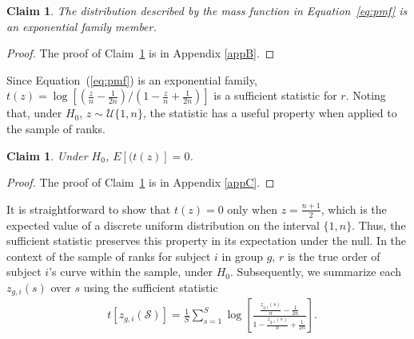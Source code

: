 \documentclass[12pt]{article}
\theoremstyle{plain}
\newtheorem{claim}[axiom]{Claim}
\begin{document}
\begin{claim}\label{cl1}
The distribution described by the mass function in Equation~\ref{eq:pmf} is an exponential family member.
\end{claim}

\begin{proof}
The proof of Claim~\ref{cl1} is in Appendix \ref{appB}.
\end{proof}

Since Equation~(\ref{eq:pmf}) is an exponential family, $t(z) = \log\left[ \left(\frac{z}{n}- \frac{1}{2n}\right)\bigg/\left(1-\frac{z}{n} + \frac{1}{2n}\right) \right]$ is a sufficient statistic for $r$. Noting that, under $H_0$, $z \sim \mathcal{U}\{1,n\}$, the statistic has a useful property when applied to the sample of ranks. 

\begin{claim}\label{cl2}
Under $H_0$, $E[(t(z)] = 0$.
\end{claim}

\begin{proof}
The proof of Claim~\ref{cl2} is in Appendix \ref{appC}.
\end{proof}

It is straightforward to show that $t(z) = 0$ only when $z = \frac{n+1}{2}$, which is the expected value of a discrete uniform distribution on the interval $\{1, n\}$. Thus, the sufficient statistic preserves this property in its expectation under the null. In the context of the sample of ranks for subject $i$ in group $g$, $r$ is the true order of subject $i$'s curve within the sample, under $H_0$. Subsequently, we summarize each $z_{g,i}(s)$ over $s$ using the sufficient statistic
\begin{align}
	&t\left[z_{g,i}(\mathcal{S})\right] = \frac{1}{S} \sum_{s=1}^S\log\left[ \frac{\frac{z_{g,i}(s)}{n}- \frac{1}{2n}}{1-\frac{z_{g,i}(s)}{n} + \frac{1}{2n}} \right]. \label{eq:suff}
\end{align}

\end{document}
